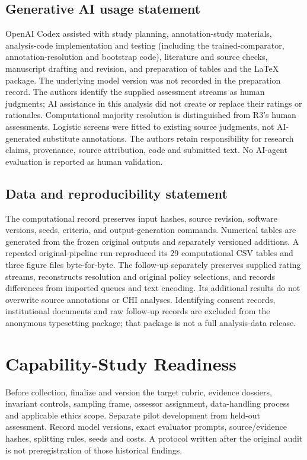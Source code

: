 \documentclass[manuscript,screen,review,anonymous]{acmart}
\begin{document}
\subsection*{Generative AI usage statement}
OpenAI Codex assisted with study planning, annotation-study materials, analysis-code implementation and testing (including the trained-comparator, annotation-resolution and bootstrap code), literature and source checks, manuscript drafting and revision, and preparation of tables and the LaTeX package. The underlying model version was not recorded in the preparation record. The authors identify the supplied assessment streams as human judgments; AI assistance in this analysis did not create or replace their ratings or rationales. Computational majority resolution is distinguished from R3's human assessments. Logistic screens were fitted to existing source judgments, not AI-generated substitute annotations. The authors retain responsibility for research claims, provenance, source attribution, code and submitted text. No AI-agent evaluation is reported as human validation.

\subsection*{Data and reproducibility statement}
The computational record preserves input hashes, source revision, software versions, seeds, criteria, and output-generation commands. Numerical tables are generated from the frozen original outputs and separately versioned additions. A repeated original-pipeline run reproduced its 29 computational CSV tables and three figure files byte-for-byte. The follow-up separately preserves supplied rating streams, reconstructs resolution and original policy selections, and records differences from imported queues and text encoding. Its additional results do not overwrite source annotations or CHI analyses. Identifying consent records, institutional documents and raw follow-up records are excluded from the anonymous typesetting package; that package is not a full analysis-data release.




\clearpage
\appendix
\section{Capability-Study Readiness}\label{app:design_extension}
Before collection, finalize and version the target rubric, evidence dossiers, invariant controls, sampling frame, assessor assignment, data-handling process and applicable ethics scope. Separate pilot development from held-out assessment. Record model versions, exact evaluator prompts, source/evidence hashes, splitting rules, seeds and costs. A protocol written after the original audit is not preregistration of those historical findings.
\end{document}
